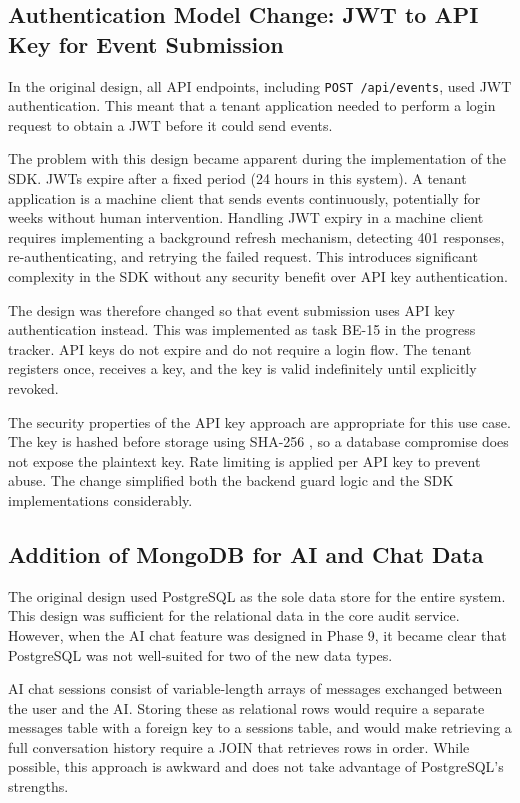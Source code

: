 \documentclass[a4paper,12pt,onecolumn]{report}
\begin{document}
\subsection{Authentication Model Change: JWT to API Key for Event Submission}

In the original design, all API endpoints, including \texttt{POST /api/events}, used JWT authentication.
This meant that a tenant application needed to perform a login request to obtain a JWT before it could send events.

The problem with this design became apparent during the implementation of the SDK.
JWTs expire after a fixed period (24 hours in this system).
A tenant application is a machine client that sends events continuously, potentially for weeks without human intervention.
Handling JWT expiry in a machine client requires implementing a background refresh mechanism, detecting 401 responses, re-authenticating, and retrying the failed request.
This introduces significant complexity in the SDK without any security benefit over API key authentication.

The design was therefore changed so that event submission uses API key authentication instead.
This was implemented as task BE-15 in the progress tracker.
API keys do not expire and do not require a login flow.
The tenant registers once, receives a key, and the key is valid indefinitely until explicitly revoked.

The security properties of the API key approach are appropriate for this use case.
The key is hashed before storage using SHA-256 \cite{sha256}, so a database compromise does not expose the plaintext key.
Rate limiting is applied per API key to prevent abuse.
The change simplified both the backend guard logic and the SDK implementations considerably.

\subsection{Addition of MongoDB for AI and Chat Data}

The original design used PostgreSQL as the sole data store for the entire system.
This design was sufficient for the relational data in the core audit service.
However, when the AI chat feature was designed in Phase 9, it became clear that PostgreSQL was not well-suited for two of the new data types.

AI chat sessions consist of variable-length arrays of messages exchanged between the user and the AI.
Storing these as relational rows would require a separate messages table with a foreign key to a sessions table, and would make retrieving a full conversation history require a JOIN that retrieves rows in order.
While possible, this approach is awkward and does not take advantage of PostgreSQL's strengths.
\end{document}
